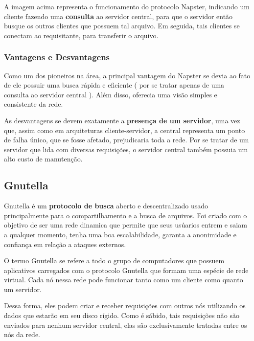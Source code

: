 \documentclass[a4paper]{article}
\begin{document}
A imagem acima representa o funcionamento do protocolo Napster, indicando um cliente fazendo uma \textbf{consulta} ao servidor central, para que o servidor então busque os outros clientes que possuem tal arquivo. Em seguida, tais clientes se conectam ao requisitante, para transferir o arquivo.

\subsubsection{Vantagens e Desvantagens}
Como um dos pioneiros na área, a principal vantagem do Napster se devia ao fato de ele possuir uma busca rápida e eficiente ( por se tratar apenas de uma consulta ao servidor central ). Além disso, oferecia uma visão simples e consistente da rede. 

As desvantagens se devem exatamente a \textbf{presença de um servidor}, uma vez que, assim como em arquiteturas cliente-servidor, a central representa um ponto de falha único, que se fosse afetado, prejudicaria toda a rede. Por se tratar de um servidor que lida com diversas requisições, o servidor central também possuia um alto custo de manutenção.
\subsection{Gnutella} %
Gnutella é um \textbf{protocolo de busca} aberto e descentralizado usado principalmente para o compartilhamento e a busca de arquivos. Foi criado com o objetivo de ser uma rede dinamica que permite que seus usúarios entrem e saiam a qualquer momento, tenha uma boa escalabilidade, garanta a anonimidade  e confiança em relação a ataques externos.\cite{gayatriGN}

O termo Gnutella se refere a todo o grupo de computadores que possuem aplicativos carregados com o protocolo Gnutella que formam uma espécie de rede virtual. Cada nó nessa rede pode funcionar tanto como um cliente como quanto um servidor. 

Dessa forma, eles podem criar e receber requisições com outros nós utilizando os dados que estarão em seu disco rígido. Como é sábido, tais requisições não são enviados para nenhum servidor central, elas são exclusivamente tratadas entre os nós da rede. 
\end{document}

